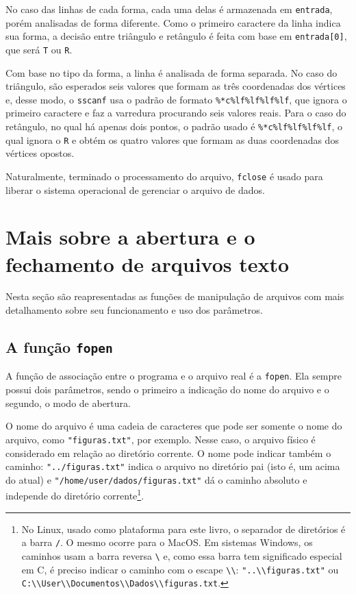 \documentclass[
  11pt,
  a4paper,
]{scrbook}
\begin{document}
No caso das linhas de cada forma, cada uma delas é armazenada em
\texttt{entrada}, porém analisadas de forma diferente. Como o primeiro
caractere da linha indica sua forma, a decisão entre triângulo e
retângulo é feita com base em \texttt{entrada{[}0{]}}, que será
\texttt{T} ou \texttt{R}.

Com base no tipo da forma, a linha é analisada de forma separada. No
caso do triângulo, são esperados seis valores que formam as três
coordenadas dos vértices e, desse modo, o \texttt{sscanf} usa o padrão
de formato \texttt{\%*c\%lf\%lf\%lf\%lf}, que ignora o primeiro
caractere e faz a varredura procurando seis valores reais. Para o caso
do retângulo, no qual há apenas dois pontos, o padrão usado é
\texttt{\%*c\%lf\%lf\%lf\%lf}, o qual ignora o \texttt{R} e obtém os
quatro valores que formam as duas coordenadas dos vértices opostos.

Naturalmente, terminado o processamento do arquivo, \texttt{fclose} é
usado para liberar o sistema operacional de gerenciar o arquivo de
dados.

\section{Mais sobre a abertura e o fechamento de arquivos
texto}\label{mais-sobre-a-abertura-e-o-fechamento-de-arquivos-texto}

Nesta seção são reapresentadas as funções de manipulação de arquivos com
mais detalhamento sobre seu funcionamento e uso dos parâmetros.

\subsection{\texorpdfstring{A função
\texttt{fopen}}{A função fopen}}\label{a-funuxe7uxe3o-fopen}

A função de associação entre o programa e o arquivo real é a
\texttt{fopen}. Ela sempre possui dois parâmetros, sendo o primeiro a
indicação do nome do arquivo e o segundo, o modo de abertura.

O nome do arquivo é uma cadeia de caracteres que pode ser somente o nome
do arquivo, como \texttt{"figuras.txt"}, por exemplo. Nesse caso, o
arquivo físico é considerado em relação ao diretório corrente. O nome
pode indicar também o caminho: \texttt{"../figuras.txt"} indica o
arquivo no diretório pai (isto é, um acima do atual) e
\texttt{"/home/user/dados/figuras.txt"} dá o caminho absoluto e
independe do diretório corrente\footnote{No Linux, usado como plataforma
  para este livro, o separador de diretórios é a barra \texttt{/}. O
  mesmo ocorre para o MacOS. Em sistemas Windows, os caminhos usam a
  barra reversa \texttt{\textbackslash{}} e, como essa barra tem
  significado especial em C, é preciso indicar o caminho com o escape
  \texttt{\textbackslash{}\textbackslash{}}:
  \texttt{"..\textbackslash{}\textbackslash{}figuras.txt"} ou
  \texttt{C:\textbackslash{}\textbackslash{}User\textbackslash{}\textbackslash{}Documentos\textbackslash{}\textbackslash{}Dados\textbackslash{}\textbackslash{}figuras.txt}.}.
\end{document}
